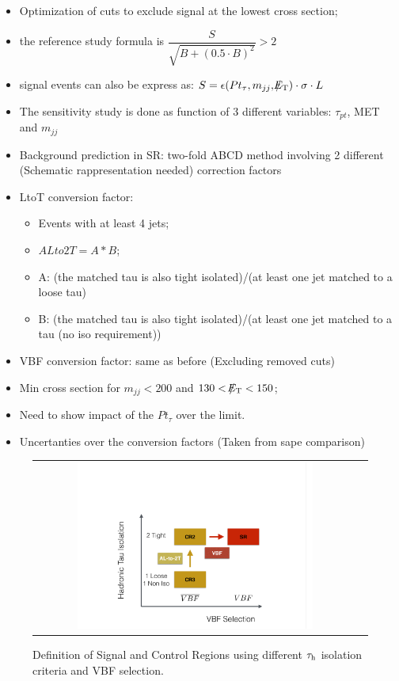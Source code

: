 \begin{itemize}
	\item Optimization of cuts to exclude signal at the lowest cross section;
	\item the reference study formula is $\dfrac{S}{\sqrt{B + (0.5 \cdot B)^{2}}} > 2$
	\item signal events can also be express as: $S = \epsilon ( Pt_{\tau} , m_{jj} ,  \slash\mkern-12mu{E}_{\text{T}} )\cdot \sigma \cdot L$
	\item The sensitivity study is done as function of 3 different variables: $\tau_{pt}$, MET and $m_{jj}$
	\item Background prediction in SR: two-fold ABCD method involving 2 different (Schematic rappresentation needed) correction factors
	\item LtoT conversion factor:
	\begin{itemize}
		\item Events with at least 4 jets;
		\item $ALto2T = A * B$;
		\item A: (the matched tau is also tight isolated)/(at least one jet matched to a loose tau)
		\item B: (the matched tau is also tight isolated)/(at least one jet matched to a tau (no iso requirement))
	\end{itemize}
		\item VBF conversion factor: same as before (Excluding removed cuts)
		\item Min cross section for $m_{jj} < 200$ and $130 < \slash\mkern-12mu{E}_{\text{T}} < 150$;
		\item Need to show impact of the $Pt_{\tau}$ over the limit.
		\item Uncertanties over the conversion factors (Taken from sape comparison)
\end{itemize}

\begin{figure}[tbh!]
	\centering
	\begin{tabular}{cc}
		\includegraphics[width=0.75\textwidth]{PLOTS/diTauHadLSotherPlots/controlregions13TeV.pdf}
	\end{tabular}
	\caption{Definition of Signal and Control Regions using different $\tau_{\text{h}}$ isolation criteria and VBF selection.}
	\label{fig:crs_13tev}
\end{figure}


